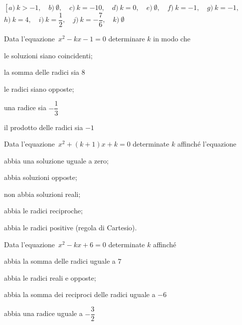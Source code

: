 \begin{flushright}
{\small
\(\left[
a)~k >-1,\quad 
b)~\emptyset,\quad 
c)~k =-10,\quad 
d)~k = 0,\quad 
e)~ \emptyset ,\quad 
f)~ k =-1 ,\quad 
g)~ k =-1 ,\quad \right.\)\\
\(\left. 
h)~ k = 4 ,\quad 
i)~ k = \dfrac{1}{2} ,\quad 
j)~ k =-\dfrac{7}{6} ,\quad 
k)~\emptyset \right.\)
}
\end{flushright}

\begin{esercizio}[*]
\label{ese:3.98}
Data l'equazione~\(x^{2}-kx -1 = 0\) determinare \(k\) in modo che
\begin{enumeratea}
\item le soluzioni siano coincidenti;~
\item la somma delle radici sia \(8\)
\item le radici siano opposte;~
\item una radice sia \(- \dfrac{1}{3}\)
\item il prodotto delle radici sia \(-1\)
\end{enumeratea}
\end{esercizio}

\begin{flushright}
\end{flushright}

\begin{esercizio}[*]
\label{ese:3.99}
Data l'equazione~\(x^{2} + (k + 1) x + k = 0\) determinate \(k\) affinché 
l'equazione
\begin{enumeratea}
\item abbia una soluzione uguale a zero;~
\item abbia soluzioni opposte;~
\item non abbia soluzioni reali;~
\item abbia le radici reciproche;~
\item abbia le radici positive (regola di Cartesio).
\end{enumeratea}
\end{esercizio}

\begin{flushright}
\end{flushright}

\begin{esercizio}[*]
\label{ese:3.100}
Data l'equazione~\(x^{2}-kx + 6 = 0\) determinate \(k\) affinché
\begin{enumeratea}
\item abbia la somma delle radici uguale a \(7\)
\item abbia le radici reali e opposte;~
\item abbia la somma dei reciproci delle radici uguale a \(-6\)
\item abbia una radice uguale a \(- \dfrac{3}{2}\)
\end{enumeratea}
\end{esercizio}

